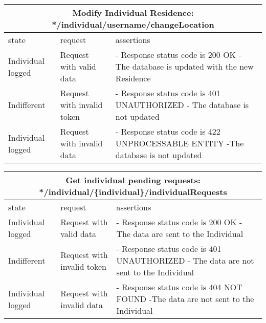 \begin{center}
	\begin{tabular}{|p{}|p{}|p{}|}
		\hline
		\multicolumn{3}{c}{Modify Individual Residence: */individual/username/changeLocation}\\

		\hline
		state & request & assertions \\
		
		\hline
		Individual logged&
		Request with valid data & 
		- Response status code is 200 OK\newline
		- The database is updated with the new Residence
		\\
		
		\hline
		Indifferent&
		Request with invalid token & 
		- Response status code is 401 UNAUTHORIZED \newline
		- The database is not updated
		\\
		
		\hline
		Individual logged&
		Request with invalid data& 
		- Response status code is 422 UNPROCESSABLE ENTITY \newline
		-The database is not updated
		\\
		\hline
	\end{tabular}
\end{center}

\begin{center}
	\begin{tabular}{|p{}|p{}|p{}|}
		\hline
		\multicolumn{3}{c}{Get individual pending requests: */individual/\{individual\}/individualRequests}\\

		\hline
		state & request & assertions \\
		
		\hline
		Individual logged&
		Request with valid data & 
		- Response status code is 200 OK\newline
		- The data are sent to the Individual
		\\
		
		\hline
		Indifferent&
		Request with invalid token & 
		- Response status code is 401 UNAUTHORIZED \newline
		- The data are not sent to the Individual
		\\
		
		\hline
		Individual logged&
		Request with invalid data& 
		- Response status code is 404 NOT FOUND \newline
		-The data are not sent to the Individual
		\\
		\hline
	\end{tabular}
\end{center}

